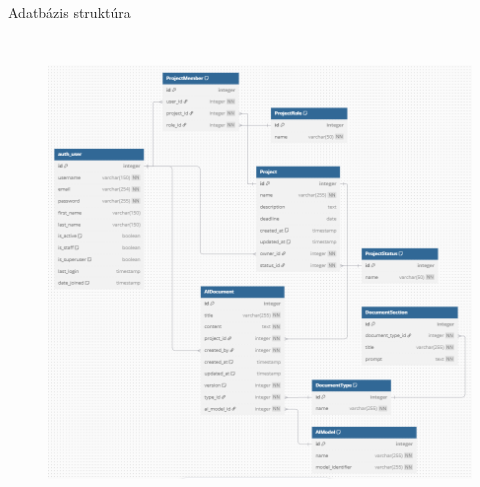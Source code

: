 \documentclass[11pt]{beamer}
\begin{document}
\begin{frame}{Adatbázis struktúra}
\begin{columns}[t]
        \begin{figure}[ht!]
            \centering
            \includegraphics[width=\textwidth]{ERD.png}
            \label{fig-erd}
        \end{figure}
    \end{columns}
    

\end{frame}
\end{document}
